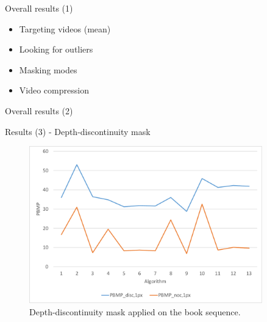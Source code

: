 \documentclass[10pt]{beamer}
\begin{document}
\begin{frame}[fragile]{Overall results (1)}
  \begin{itemize}
    \item Targeting videos (mean)
    \item Looking for outliers
    \item Masking modes
    \item Video compression
  \end{itemize}
\end{frame}

\begin{frame}[fragile]{Overall results (2)}
  \begin{table}
  \centering
  \caption{Result table for comparison of own implementation with Cambridge dataset}
  \end{table}
\end{frame}

\begin{frame}[fragile]{Results (3) - Depth-discontinuity mask}
  \begin{figure}[h!]
  \centering
  \includegraphics[width=0.9\textwidth]{../paper/src/images/evaluation/plots/01-book-pbmp-disc-1.pdf}
  \caption{Depth-discontinuity mask applied on the book sequence.}
  \end{figure}
\end{frame}
\end{document}
